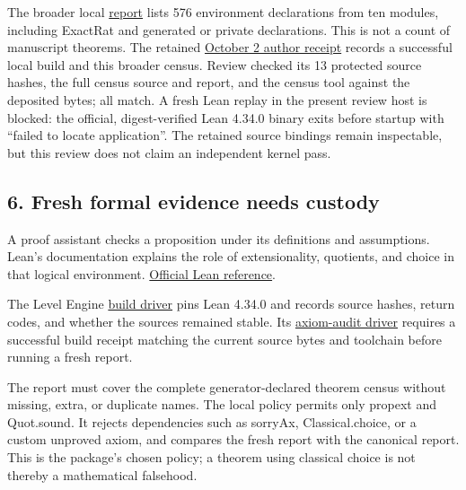 \documentclass[
  11pt,
]{article}
\begin{document}
The broader local
\href{https://github.com/dbccpage/the_symbol_game/blob/main/omega_engine_education/documentation/030_pfp_proposal_fidelity_protocol_pfp/papers/omega_engine_symbol_game/008_pfp_mssn_tower_challenges_and_retraction_benchmarks/lean4/full_axiom_report.txt}{report}
lists 576 environment declarations from ten modules, including ExactRat
and generated or private declarations. This is not a count of manuscript
theorems. The retained
\href{https://github.com/dbccpage/the_symbol_game/blob/main/omega_engine_education/documentation/030_pfp_proposal_fidelity_protocol_pfp/papers/omega_engine_symbol_game/008_pfp_mssn_tower_challenges_and_retraction_benchmarks/docs/release_validation_2026_10_02.json}{October
2 author receipt} records a successful local build and this broader
census. Review checked its 13 protected source hashes, the full census
source and report, and the census tool against the deposited bytes; all
match. A fresh Lean replay in the present review host is blocked: the
official, digest-verified Lean 4.34.0 binary exits before startup with
``failed to locate application''. The retained source bindings remain
inspectable, but this review does not claim an independent kernel pass.

\hypertarget{fresh-formal-evidence-needs-custody}{%
\subsection{6. Fresh formal evidence needs
custody}\label{fresh-formal-evidence-needs-custody}}

A proof assistant checks a proposition under its definitions and
assumptions. Lean's documentation explains the role of extensionality,
quotients, and choice in that logical environment.
\href{https://lean-lang.org/theorem_proving_in_lean4/Axioms-and-Computation/}{Official
Lean reference}.

The Level Engine
\href{https://github.com/dbccpage/the_symbol_game/blob/52cb5457f6c485ba548cfd292f6012a941ed22cf/omega_engine_operations/use_cases/level_engine/lean_build.py}{build
driver} pins Lean 4.34.0 and records source hashes, return codes, and
whether the sources remained stable. Its
\href{https://github.com/dbccpage/the_symbol_game/blob/52cb5457f6c485ba548cfd292f6012a941ed22cf/omega_engine_operations/use_cases/level_engine/lean_audit.py}{axiom-audit
driver} requires a successful build receipt matching the current source
bytes and toolchain before running a fresh report.

The report must cover the complete generator-declared theorem census
without missing, extra, or duplicate names. The local policy permits
only propext and Quot.sound. It rejects dependencies such as sorryAx,
Classical.choice, or a custom unproved axiom, and compares the fresh
report with the canonical report. This is the package's chosen policy; a
theorem using classical choice is not thereby a mathematical falsehood.
\end{document}
